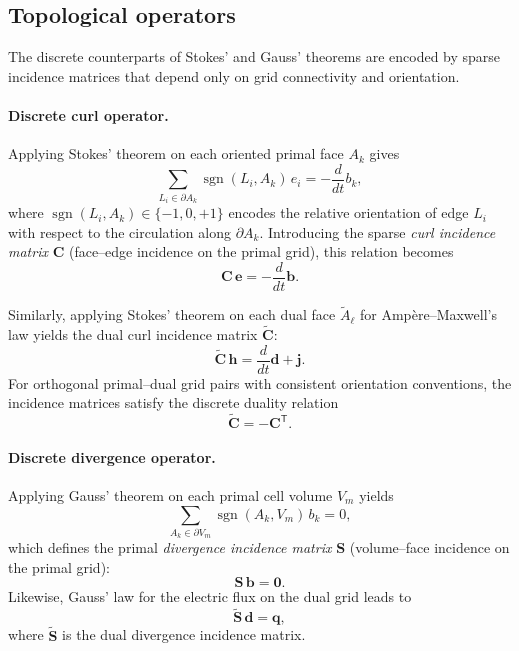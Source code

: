 \subsection{Topological operators}
\label{sec:mge_topological_ops}

The discrete counterparts of Stokes' and Gauss' theorems are encoded by sparse incidence matrices that depend only on grid connectivity and orientation.

\paragraph{Discrete curl operator.}
Applying Stokes' theorem on each oriented primal face $A_k$ gives
\begin{equation}
\sum_{L_i \in \partial A_k} \operatorname{sgn}(L_i,A_k)\, e_i
= -\frac{d}{dt} b_k,
\end{equation}
where $\operatorname{sgn}(L_i,A_k)\in\{-1,0,+1\}$ encodes the relative orientation of edge $L_i$ with respect to the circulation along $\partial A_k$. Introducing the sparse \emph{curl incidence matrix} $\mathbf{C}$ (face--edge incidence on the primal grid), this relation becomes
\begin{equation}
\mathbf{C}\,\mathbf{e} = -\frac{d}{dt}\mathbf{b}.
\label{eq:mge_faraday}
\end{equation}

Similarly, applying Stokes' theorem on each dual face $\tilde A_\ell$ for Amp\`ere--Maxwell's law yields the dual curl incidence matrix $\tilde{\mathbf{C}}$:
\begin{equation}
\tilde{\mathbf{C}}\,\mathbf{h} = \frac{d}{dt}\mathbf{d} + \mathbf{j}.
\label{eq:mge_ampere_dual}
\end{equation}
For orthogonal primal--dual grid pairs with consistent orientation conventions, the incidence matrices satisfy the discrete duality relation
\begin{equation}
\tilde{\mathbf{C}} = -\mathbf{C}^{\mathsf{T}}.
\label{eq:curl_duality}
\end{equation}

\paragraph{Discrete divergence operator.}
Applying Gauss' theorem on each primal cell volume $V_m$ yields
\begin{equation}
\sum_{A_k \in \partial V_m} \operatorname{sgn}(A_k,V_m)\, b_k = 0,
\end{equation}
which defines the primal \emph{divergence incidence matrix} $\mathbf{S}$ (volume--face incidence on the primal grid):
\begin{equation}
\mathbf{S}\,\mathbf{b} = \mathbf{0}.
\label{eq:mge_gaussB}
\end{equation}
Likewise, Gauss' law for the electric flux on the dual grid leads to
\begin{equation}
\tilde{\mathbf{S}}\,\mathbf{d} = \mathbf{q},
\label{eq:mge_gaussD}
\end{equation}
where $\tilde{\mathbf{S}}$ is the dual divergence incidence matrix.

